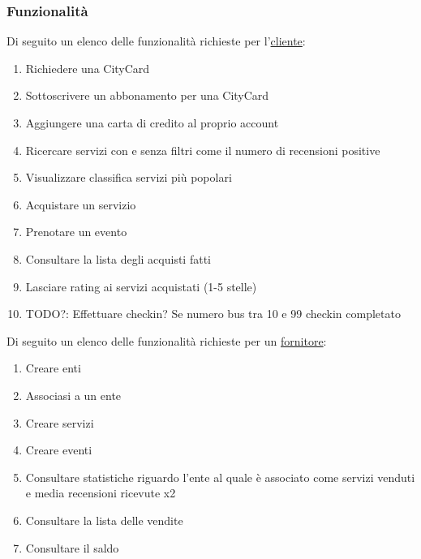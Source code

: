 

\subsubsection{Funzionalità}
Di seguito un elenco delle funzionalità richieste per l'\ul{cliente}:
\begin{enumerate}[label=a\arabic*)]
    \item Richiedere una CityCard
    \item Sottoscrivere un abbonamento per una CityCard
    \item Aggiungere una carta di credito al proprio account
    
    \item Ricercare servizi con e senza filtri come il numero di recensioni positive
    \item Visualizzare classifica servizi più popolari %
    \item Acquistare un servizio
    
    \item Prenotare un evento
    
    \item Consultare la lista degli acquisti fatti
    \item Lasciare rating ai servizi acquistati (1-5 stelle)
    
    \item TODO?: Effettuare checkin? Se numero bus tra 10 e 99 checkin completato
\end{enumerate}

\vspace{0.5cm}

Di seguito un elenco delle funzionalità richieste per un \ul{fornitore}: 
\begin{enumerate}[label=b\arabic*)]
    \item Creare enti
    \item Associasi a un ente
    \item Creare servizi
    \item Creare eventi
    
    \item Consultare statistiche riguardo l'ente al quale è associato come servizi venduti e media recensioni ricevute x2
    
    \item Consultare la lista delle vendite
    \item Consultare il saldo
    
\end{enumerate}

